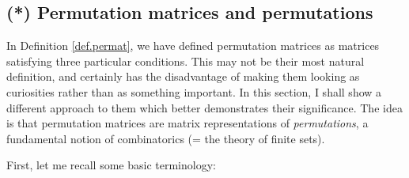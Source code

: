 \documentclass[numbers=enddot,12pt,final,onecolumn,notitlepage]{scrartcl}%
\theoremstyle{definition}
\begin{document}
\subsection{\label{sect.gauss.permat.perms}(*) Permutation matrices and
permutations}

In Definition \ref{def.permat}, we have defined permutation matrices as
matrices satisfying three particular conditions. This may not be their most
natural definition, and certainly has the disadvantage of making them looking
as curiosities rather than as something important. In this section, I shall
show a different approach to them which better demonstrates their
significance. The idea is that permutation matrices are matrix representations
of \textit{permutations}, a fundamental notion of combinatorics (= the theory
of finite sets).

First, let me recall some basic terminology:
\end{document}
